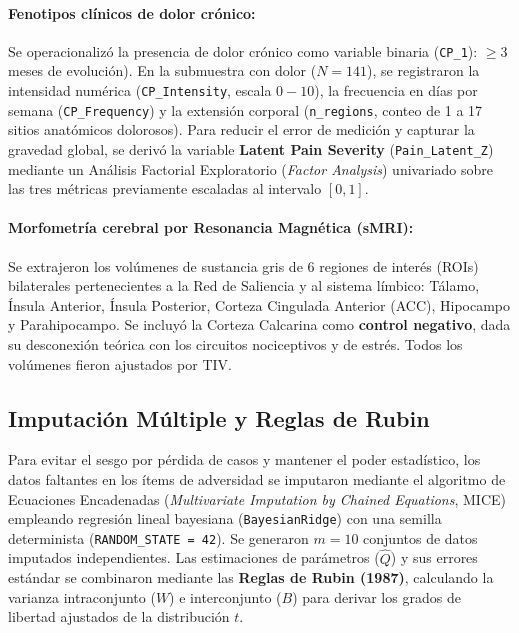 \documentclass[11pt,a4paper]{article}
\begin{document}
\paragraph{Fenotipos clínicos de dolor crónico:}
Se operacionalizó la presencia de dolor crónico como variable binaria (\texttt{CP\_1}): $ \ge 3$ meses de evolución). En la submuestra con dolor ($N = 141$), se registraron la
intensidad numérica (\texttt{CP\_Intensity}, escala $0-10$), la frecuencia en días por semana (\texttt{CP\_Frequency}) y la extensión corporal (\texttt{n\_regions}, conteo de 
1 a 17 sitios anatómicos dolorosos). Para reducir el error de medición y capturar la gravedad global, se derivó la variable \textbf{Latent Pain Severity} (\texttt{Pain\_Latent\_Z})
mediante un Análisis Factorial Exploratorio (\textit{Factor Analysis}) univariado sobre las tres métricas previamente escaladas al intervalo $[0, 1]$.

\paragraph{Morfometría cerebral por Resonancia Magnética (sMRI):}
Se extrajeron los volúmenes de sustancia gris de 6 regiones de interés (ROIs) bilaterales pertenecientes a la Red de Saliencia
y al sistema límbico: Tálamo, Ínsula Anterior, Ínsula Posterior, Corteza Cingulada Anterior (ACC), Hipocampo y Parahipocampo. Se incluyó la Corteza Calcarina como \textbf{control negativo},
dada su desconexión teórica con los circuitos nociceptivos y de estrés. Todos los volúmenes fieron ajustados por TIV. 

\subsection{Imputación Múltiple y Reglas de Rubin}
Para evitar el sesgo por pérdida de casos y mantener el poder estadístico, los datos faltantes en los ítems de adversidad se imputaron mediante el algoritmo de Ecuaciones Encadenadas (\textit{Multivariate
Imputation by Chained Equations}, MICE) empleando regresión lineal bayesiana (\texttt{BayesianRidge}) con una semilla determinista (\texttt{RANDOM\_STATE = 42}). Se generaron $m = 10$ 
conjuntos de datos imputados independientes. Las estimaciones de parámetros ($\hat{Q}$) y sus errores estándar se combinaron mediante las \textbf{Reglas de Rubin (1987)}, calculando la varianza intraconjunto
($W$) e interconjunto ($B$) para derivar los grados de libertad ajustados de la distribución $t$.
\end{document}

